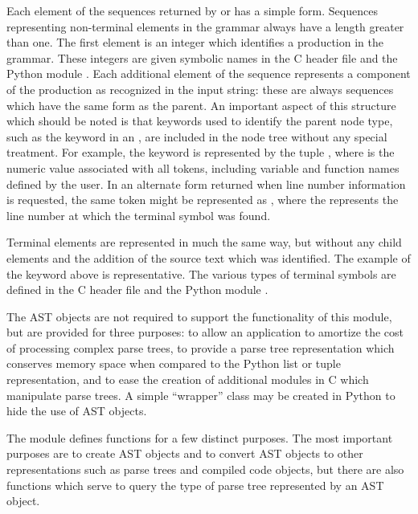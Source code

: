 Each element of the sequences returned by  or
 has a simple form.  Sequences representing
non-terminal elements in the grammar always have a length greater than
one.  The first element is an integer which identifies a production in
the grammar.  These integers are given symbolic names in the C header
file  and the Python module
.  Each additional element of the sequence represents
a component of the production as recognized in the input string: these
are always sequences which have the same form as the parent.  An
important aspect of this structure which should be noted is that
keywords used to identify the parent node type, such as the keyword
 in an , are included in the node tree without
any special treatment.  For example, the  keyword is
represented by the tuple , where  is the
numeric value associated with all  tokens, including
variable and function names defined by the user.  In an alternate form
returned when line number information is requested, the same token
might be represented as , where the 
represents the line number at which the terminal symbol was found.

Terminal elements are represented in much the same way, but without
any child elements and the addition of the source text which was
identified.  The example of the  keyword above is
representative.  The various types of terminal symbols are defined in
the C header file  and the Python module
.

The AST objects are not required to support the functionality of this
module, but are provided for three purposes: to allow an application
to amortize the cost of processing complex parse trees, to provide a
parse tree representation which conserves memory space when compared
to the Python list or tuple representation, and to ease the creation
of additional modules in C which manipulate parse trees.  A simple
``wrapper'' class may be created in Python to hide the use of AST
objects.

The  module defines functions for a few distinct
purposes.  The most important purposes are to create AST objects and
to convert AST objects to other representations such as parse trees
and compiled code objects, but there are also functions which serve to
query the type of parse tree represented by an AST object.


